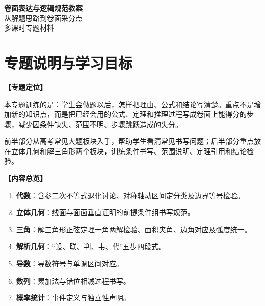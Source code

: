 \documentclass[11pt,a4paper]{ctexart}
\newcommand{\teachblock}[2]{%
  \par\addvspace{0.55em}%
  \noindent\textbf{【#1】}\par\nobreak
  \begingroup
    \raggedright
    \setlength{\parskip}{0.35em}%
    #2\par
  \endgroup
}
\begin{document}
\begin{center}
  {\Large\bfseries 卷面表达与逻辑规范教案}\\
  \vspace{0.35em}
  {\large 从解题思路到卷面采分点}\\
  \vspace{0.35em}
  多课时专题材料
\end{center}

\section{专题说明与学习目标}

\teachblock{专题定位}{
  本专题训练的是：学生会做题以后，怎样把理由、公式和结论写清楚。重点不是增加新的知识点，而是把已经会用的公式、定理和推理过程写成卷面上能得分的步骤，减少因条件缺失、范围不明、步骤跳跃造成的失分。
  
  前半部分从高考常见大题板块入手，帮助学生看清常见书写问题；后半部分重点放在立体几何和解三角形两个板块，训练条件书写、范围说明、定理引用和结论检验。
}

\teachblock{内容总览}{
  \begin{enumerate}[label=\arabic*. , itemsep=0.1em]
    \item \textbf{代数}：含参二次不等式退化讨论、对称轴动区间定分类及边界等号检验。
    \item \textbf{立体几何}：线面与面面垂直证明的前提条件组书写规范。
    \item \textbf{三角}：解三角形正弦定理一角两解检验、面积夹角、边角对应及弧度统一。
    \item \textbf{解析几何}：“设、联、判、韦、代”五步四段式。
    \item \textbf{导数}：导数符号与单调区间对应。
    \item \textbf{数列}：累加法与错位相减过程书写。
    \item \textbf{概率统计}：事件定义与独立性声明。
  \end{enumerate}
}
\end{document}

